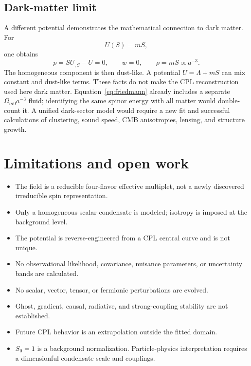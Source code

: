 \documentclass[11pt]{article}
\begin{document}
\subsection{Dark-matter limit}

A different potential demonstrates the mathematical connection to dark matter.
For
\begin{equation}
  U(S)=mS,
\end{equation}
one obtains
\begin{equation}
  p=SU_{,S}-U=0,
  \qquad w=0,
  \qquad \rho=mS\propto a^{-3}.
\end{equation}
The homogeneous component is then dust-like.  A potential
$U=\Lambda+mS$ can mix constant and dust-like terms.  These facts do not make
the CPL reconstruction used here dark matter.  Equation~\eqref{eq:friedmann}
already includes a separate $\Omega_{m0}a^{-3}$ fluid; identifying the same
spinor energy with all matter would double-count it.  A unified dark-sector
model would require a new fit and successful calculations of clustering, sound
speed, CMB anisotropies, lensing, and structure growth.

\section{Limitations and open work}

\begin{itemize}
\item The field is a reducible four-flavor effective multiplet, not a newly
discovered irreducible spin representation.
\item Only a homogeneous scalar condensate is modeled; isotropy is imposed at
the background level.
\item The potential is reverse-engineered from a CPL central curve and is not
unique.
\item No observational likelihood, covariance, nuisance parameters, or
uncertainty bands are calculated.
\item No scalar, vector, tensor, or fermionic perturbations are evolved.
\item Ghost, gradient, causal, radiative, and strong-coupling stability are not
established.
\item Future CPL behavior is an extrapolation outside the fitted domain.
\item $S_0=1$ is a background normalization.  Particle-physics interpretation
requires a dimensionful condensate scale and couplings.
\end{itemize}
\end{document}

